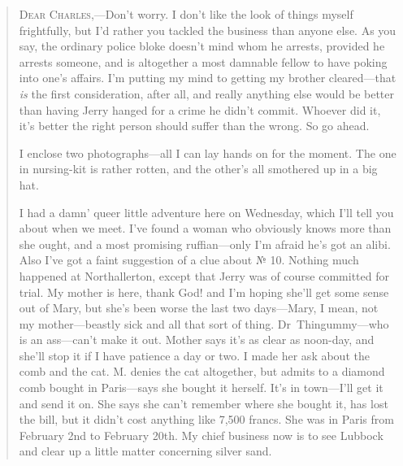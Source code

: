 \begin{quotation}

\textsc{Dear Charles},—Don't worry. I don't like the look of things myself frightfully, but I'd rather you tackled the business than anyone else. As you say, the ordinary police bloke doesn't mind whom he arrests, provided he arrests someone, and is altogether a most damnable fellow to have poking into one's affairs. I'm putting my mind to getting my brother cleared—that \textit{is} the first consideration, after all, and really anything else would be better than having Jerry hanged for a crime he didn't commit. Whoever did it, it's better the right person should suffer than the wrong. So go ahead.

I enclose two photographs—all I can lay hands on for the moment. The one in nursing-kit is rather rotten, and the other's all smothered up in a big hat.

I had a damn' queer little adventure here on Wednesday, which I'll tell you about when we meet. I've found a woman who obviously knows more than she ought, and a most promising ruffian—only I'm afraid he's got an alibi. Also I've got a faint suggestion of a clue about № 10. Nothing much happened at Northallerton, except that Jerry was of course committed for trial. My mother is here, thank God! and I'm hoping she'll get some sense out of Mary, but she's been worse the last two days—Mary, I mean, not my mother—beastly sick and all that sort of thing. Dr~Thingummy—who is an ass—can't make it out. Mother says it's as clear as noon-day, and she'll stop it if I have patience a day or two. I made her ask about the comb and the cat. M. denies the cat altogether, but admits to a diamond comb bought in Paris—says she bought it herself. It's in town—I'll get it and send it on. She says she can't remember where she bought it, has lost the bill, but it didn't cost anything like 7,500 francs. She was in Paris from February 2nd to February 20th. My chief business now is to see Lubbock and clear up a little matter concerning silver sand.


\end{quotation}
